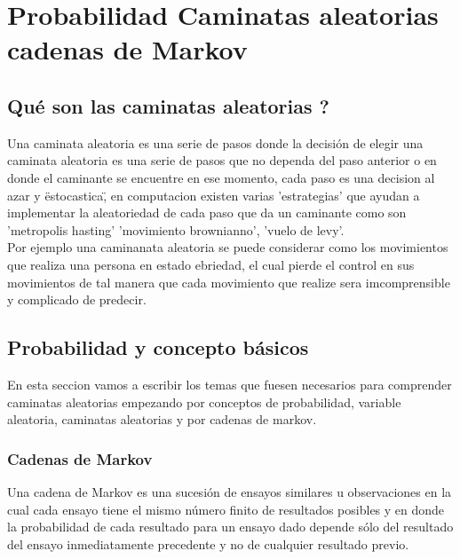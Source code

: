\chapter{Probabilidad Caminatas aleatorias cadenas de  Markov}
\label{Chapter1}


\section {\textquestiondown Qu\'e son las caminatas aleatorias ?}
Una caminata aleatoria es una serie de pasos donde la decisi\'on de
elegir una caminata aleatoria es una serie de pasos que no dependa del
paso anterior o en donde el caminante se encuentre en ese momento,
cada paso es una decision al azar y \"estocastica\", en computacion
existen varias 'estrategias' que ayudan a implementar la aleatoriedad
de cada paso que da un caminante como son 'metropolis hasting'
'movimiento brownianno', 'vuelo de levy'.\\

Por ejemplo una caminanata aleatoria se puede considerar como los
movimientos que realiza una persona en estado ebriedad, el cual pierde
el control en sus movimientos de tal manera que cada movimiento que
realize sera imcomprensible y complicado de predecir.






\section{Probabilidad y concepto b\'asicos}
En esta seccion vamos a escribir los temas que fuesen necesarios para
comprender caminatas aleatorias empezando por conceptos de
probabilidad, variable aleatoria, caminatas aleatorias y por cadenas
de markov.


\subsection{Cadenas de Markov}
Una cadena de Markov es una sucesi\'on de ensayos similares u
observaciones en la cual cada ensayo tiene el mismo n\'umero finito de
resultados posibles y en donde la probabilidad de cada resultado para
un ensayo dado depende s\'olo del resultado del ensayo inmediatamente
precedente y no de cualquier resultado previo.


